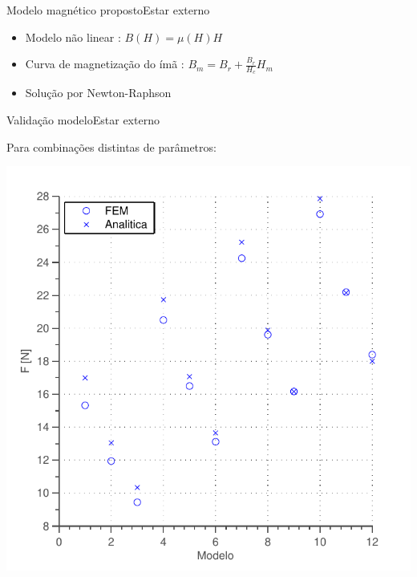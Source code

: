 \documentclass{beamer}
\begin{document}
\begin{frame}{Modelo magnético proposto}{Estar externo}
	\begin{itemize}
	\item Modelo não linear : $B(H) = \mu(H) H$
	\item Curva de magnetização do ímã : $B_m = B_r + \frac{B_r}{H_c} H_m$
	\item Solução por Newton-Raphson
	\end{itemize}
	
	\centering{
	}
\end{frame}

\begin{frame}{Validação modelo}{Estar externo}

Para combinações distintas de parâmetros:
	
\begin{center}
\includegraphics[width=0.7\linewidth]{../../Dissertacao/Figs/Simulacoes/Passivo2/validacao_passivo_parametros}
\end{center}
\end{frame}

%
%
\end{document}
